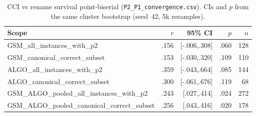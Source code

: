 \begin{table}[t]
\centering
\small
\caption{CCI vs rename survival point-biserial
(\texttt{P2\_P1\_convergence.csv}). CIs and $p$ from the same
cluster bootstrap (seed~42, 5k resamples).}
\label{tab:p2p1}
\begin{tabular}{lrrrr}
\toprule
Scope & $r$ & 95\% CI & $p$ & $n$ \\
\midrule
GSM\_all\_instances\_with\_p2 & .156 & [-.006,.308] & .060 & 128 \\
GSM\_canonical\_correct\_subset & .153 & [-.030,.320] & .109 & 110 \\
ALGO\_all\_instances\_with\_p2 & .359 & [-.043,.664] & .085 & 144 \\
ALGO\_canonical\_correct\_subset & .300 & [-.061,.676] & .119 & 68 \\
GSM\_ALGO\_pooled\_all\_instances\_with\_p2 & .243 & [.027,.414] & .024 & 272 \\
GSM\_ALGO\_pooled\_canonical\_correct\_subset & .256 & [.043,.416] & .020 & 178 \\
\bottomrule
\end{tabular}
\end{table}

